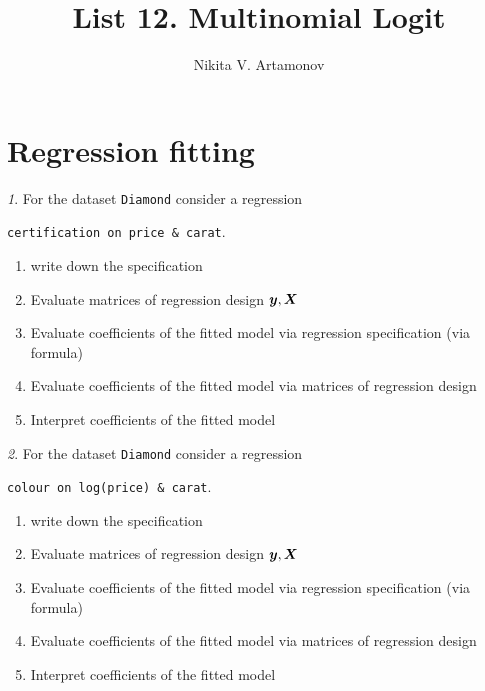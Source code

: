 \documentclass[12pt]{article}
\title{List 12. Multinomial Logit}
\author{Nikita V. Artamonov}
\theoremstyle{remark}
\newtheorem{problem}{}[section]
\begin{document}
\maketitle

\tableofcontents

\section{Regression fitting}

\begin{problem}
For the dataset \texttt{Diamond} consider a regression
\begin{center}
	\texttt{certification on price \& carat}.
\end{center}
\begin{enumerate}
	\item write down the specification
	\item Evaluate matrices of regression design \({\bm y}, {\bm X}\)
	\item Evaluate coefficients of the fitted model via 
	regression specification (via formula)
	\item Evaluate coefficients of the fitted model via 
	matrices of regression design
	\item Interpret coefficients of the fitted model
\end{enumerate}
\end{problem}

\begin{problem}
For the dataset \texttt{Diamond} consider a regression
\begin{center}
	\texttt{colour on log(price) \& carat}.
\end{center}
\begin{enumerate}
	\item write down the specification
	\item Evaluate matrices of regression design \({\bm y}, {\bm X}\)
	\item Evaluate coefficients of the fitted model via 
	regression specification (via formula)
	\item Evaluate coefficients of the fitted model via 
	matrices of regression design
	\item Interpret coefficients of the fitted model
\end{enumerate}
\end{problem}
\end{document}
